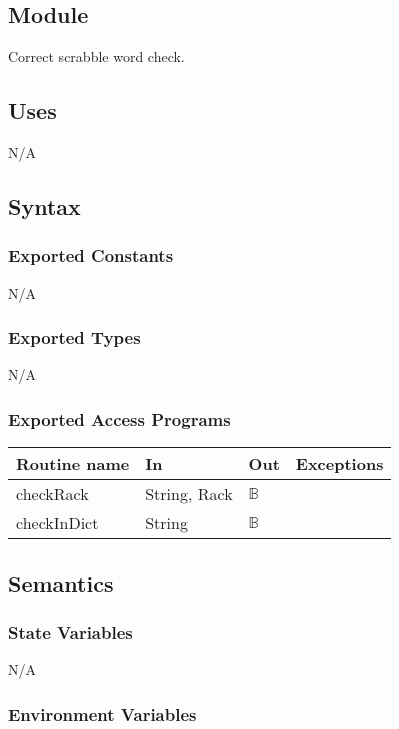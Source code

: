 \documentclass[12pt]{article}
\begin{document}
\subsection*{Module}

Correct scrabble word check.

\subsection* {Uses}

N/A

\subsection* {Syntax}

\subsubsection* {Exported Constants}
N/A
\subsubsection* {Exported Types}

N/A

\subsubsection* {Exported Access Programs}

\begin{tabular}{| l | l | l | l |}
\hline
\textbf{Routine name} & \textbf{In} & \textbf{Out} & \textbf{Exceptions}\\
\hline
checkRack & String, Rack & $\mathbb{B}$ & \\
\hline
checkInDict & String & $\mathbb{B}$ & \\
\hline
\end{tabular}

\subsection* {Semantics}

\subsubsection* {State Variables}

N/A

\subsubsection* {Environment Variables}
\end{document}
